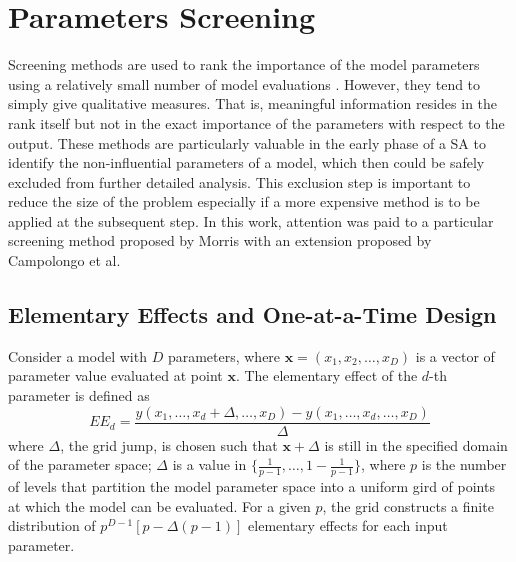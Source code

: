 \section{Parameters Screening}\label{sec:sa_parameters_screening}

Screening methods are used to rank the importance of the model parameters using a relatively small number of model evaluations \cite{Saltelli2004}.
However, they tend to simply give qualitative measures.
That is, meaningful information resides in the rank itself but not in the exact importance of the parameters with respect to the output. 
These methods are particularly valuable in the early phase of a SA to identify the non-influential parameters of a model,
which then could be safely excluded from further detailed analysis. 
This exclusion step is important to reduce the size of the problem especially if a more expensive method is to be applied at the subsequent step. 
In this work, attention was paid to a particular screening method proposed by Morris \cite{Morris1991} with an extension proposed by Campolongo et al. \cite{Campolongo2011}

\subsection{Elementary Effects and One-at-a-Time Design}

Consider a model with $D$ parameters, where $\mathbf{x} = (x_1, x_2, \dots,x_D)$ is a vector of parameter value evaluated at point $\mathbf{x}$.
The elementary effect of the $d$-th parameter is defined as
\begin{equation}
EE_d = \frac{y(x_1, \dots, x_d+\Delta,\dots,x_D) - y(x_1, \dots, x_d,\dots,x_D)}{\Delta}
\end{equation}
where $\Delta$, the grid jump, is chosen such that $\mathbf{x} + \Delta$ is still in the specified domain of the parameter space; $\Delta$ is a value in $\{\frac{1}{p-1}, \dots, 1 - \frac{1}{p-1}\}$, 
where $p$ is the number of levels that partition the model parameter space into a uniform gird of points at which the model can be evaluated. 
For a given $p$, the grid constructs a finite distribution of $p^{D-1}[p - \Delta(p-1)]$ elementary effects for each input parameter.

